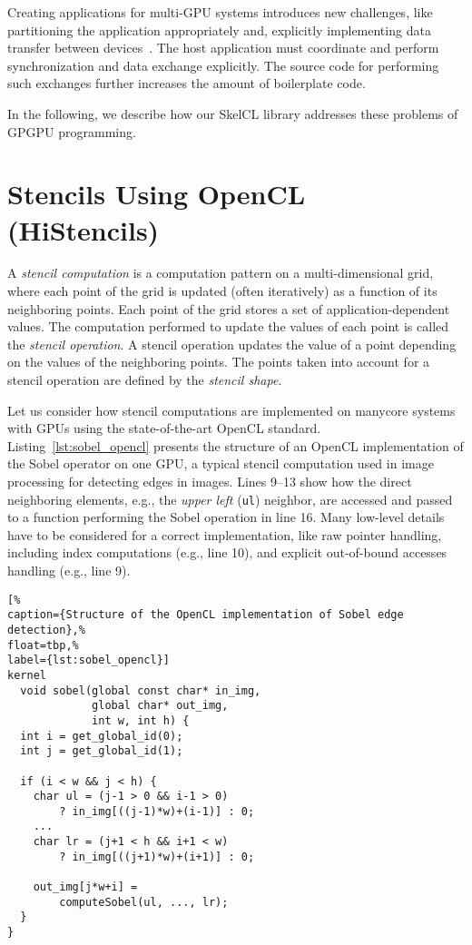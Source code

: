 Creating applications for multi-GPU systems introduces new challenges, like partitioning the application appropriately and, explicitly implementing data transfer between devices~\cite{SchellmannVG08}.
The host application must coordinate and perform synchronization and data exchange explicitly.
The source code for performing such exchanges further increases the amount of boilerplate code.

In the following, we describe how our SkelCL library addresses these problems of GPGPU programming.


\section{Stencils Using OpenCL (HiStencils)}
\label{sec:background}

A \emph{stencil computation} is a computation pattern on a multi-dimensional grid, where each point of the grid is updated (often iteratively) as a function of its neighboring points.
Each point of the grid stores a set of application-dependent values.
The computation performed to update the values of each point is called the \emph{stencil operation}.
A stencil operation updates the value of a point depending on the values of the neighboring points.
The points taken into account for a stencil operation are defined by the \emph{stencil shape}.

Let us consider how stencil computations are implemented on manycore systems with GPUs using the state-of-the-art OpenCL standard.
Listing~\ref{lst:sobel_opencl} presents the structure of an OpenCL implementation of the Sobel operator on one GPU, a typical stencil computation used in image processing for detecting edges in images.
Lines 9--13 show how the direct neighboring elements, e.g., the \emph{upper left} (\texttt{ul}) neighbor, are accessed and passed to a function performing the Sobel operation in line 16.
Many low-level details have to be considered for a correct implementation, like raw pointer handling, including index computations (e.g., line 10), and explicit out-of-bound  accesses handling (e.g., line 9).

\begin{lstlisting}[%
caption={Structure of the OpenCL implementation of Sobel edge detection},%
float=tbp,%
label={lst:sobel_opencl}]
kernel
  void sobel(global const char* in_img,
             global char* out_img,
             int w, int h) {
  int i = get_global_id(0);
  int j = get_global_id(1);

  if (i < w && j < h) {
    char ul = (j-1 > 0 && i-1 > 0)
        ? in_img[((j-1)*w)+(i-1)] : 0;
    ...
    char lr = (j+1 < h && i+1 < w)
        ? in_img[((j+1)*w)+(i+1)] : 0;

    out_img[j*w+i] =
        computeSobel(ul, ..., lr);
  }
}
\end{lstlisting}

